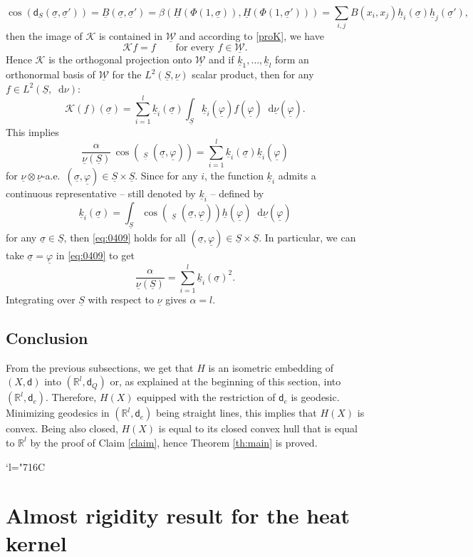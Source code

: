 \documentclass[10pt]{amsart}
\newcommand{\Changelback}{\mathcode`l="716C}
\theoremstyle{plain}
\theoremstyle{definition}
\newcommand{\setR}{\mathbb{R}}
\newcommand{\cW}{\underline{\mathcal{W}}}
\let\phi\varphi
\newcommand{\di}{\mathop{}\!\mathrm{d}}
\newcommand{\dist}{\mathsf{d}}
\newcommand{\uB}{\underline{B}}
\newcommand{\usigma}{\underline{\sigma}}
\DeclareMathOperator{\udist}{\underline{\dist}}
\newcommand{\uphi}{\underline{\phi}}
\newcommand{\uH}{\underline{H}}
\newcommand{\uS}{\underline{S}}
\newcommand{\unu}{\underline{\nu}}
\newcommand{\uh}{\underline{h}}
\begin{document}
\begin{equation}\label{expcos}\cos(\dist_S(\usigma,\usigma'))=\uB(\usigma,\usigma')=\beta\left(\uH(\Phi(1,\usigma)),\uH(\Phi(1,\usigma'))\right)=\sum_{i,j} B(x_i,x_j) \uh_i(\usigma)\uh_j(\usigma'),
\end{equation}
then the image of $\mathcal{K}$ is contained in $\cW$ and according to \eqref{proK}, we have
\[
\mathcal{K}f=f \qquad \text{for every $f \in \cW$.}
\]
Hence $\mathcal{K}$ is the orthogonal projection onto $\cW$ and
if $\underline{k}_1,\ldots, \underline{k}_l$ form an orthonormal basis of $\cW$ for the $L^2(\uS,\unu)$ scalar product, then for any $f\in L^2(\uS,\di\nu)$:
\[
\mathcal{K}(f)(\usigma)= \sum_{i=1}^l \underline{k}_i(\usigma) \int_{\uS} \underline{k}_i(\uphi) f(\uphi) \di \unu(\uphi).
\]
This implies
\begin{equation}\label{eq:0409}
\frac{\alpha}{\unu(\uS)}\, \cos(\udist_{\uS}(\usigma,\uphi)) = \sum_{i=1}^l \underline{k}_i(\usigma) \underline{k}_i(\uphi)
\end{equation}
for $\unu\otimes \unu$-a.e.\ $(\usigma,\uphi) \in \uS \times \uS$. Since for any $i$, the function $\underline{k}_i$ admits a continuous representative -- still denoted by $\underline{k}_i$ -- defined by
\[
\underline{k}_i (\usigma) = \int_{\uS} \cos(\udist_{\uS}(\usigma,\uphi)) \uh(\uphi) \di \unu(\uphi)
\]
for any $\usigma \in \uS$, then \eqref{eq:0409} holds for all $(\usigma,\uphi) \in \uS \times \uS$. In particular, we can take $\usigma = \uphi$ in \eqref{eq:0409} to get
\[
\frac{\alpha}{\unu(\uS)} = \sum_{i=1}^l \underline{k}_i(\usigma)^2.
\]
Integrating over $\uS$ with respect to $\unu$ gives $\alpha = l$.

\subsection{Conclusion}

From the previous subsections, we get that $H$ is an isometric embedding of $(X,\dist)$ into $(\setR^l,\dist_Q)$ or, as explained at the beginning of this section, into $(\setR^l,\dist_e)$. Therefore, $H(X)$ equipped with the restriction of $\dist_e$ is geodesic. Minimizing geodesics in $(\setR^l,\dist_e)$ being straight lines, this implies that $H(X)$ is convex. Being also closed, $H(X)$ is equal to its closed convex hull that is equal to $\setR^l$ by the proof of Claim \ref{claim}, hence Theorem \ref{th:main} is proved.

\Changelback
\section{Almost rigidity result for the heat kernel}\label{sec:5}
\end{document}
